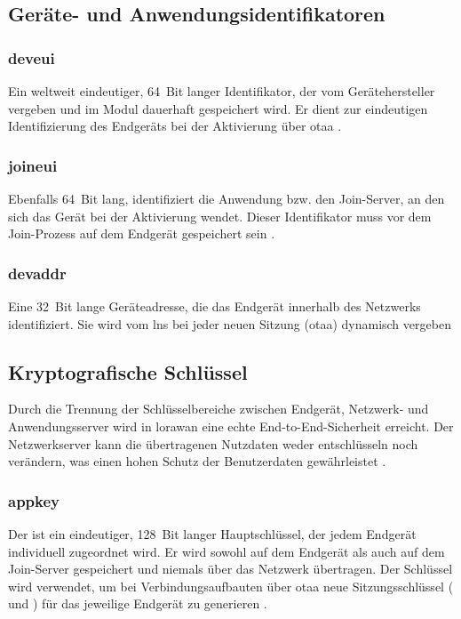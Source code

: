 	\subsection{Geräte- und Anwendungsidentifikatoren}
	
	\subsubsection{\acl{deveui} }
	Ein weltweit eindeutiger, 64~Bit langer Identifikator, der vom Gerätehersteller vergeben und im Modul dauerhaft gespeichert wird. Er dient zur eindeutigen Identifizierung des Endgeräts bei der Aktivierung über \ac{otaa} \cite[44]{LoRaAlliance:2022} \cite{Montagny:2022}.
	
	\subsubsection{\acl{joineui} }
	Ebenfalls 64~Bit lang, identifiziert die Anwendung bzw. den Join-Server, an den sich das Gerät bei der Aktivierung wendet. Dieser Identifikator muss vor dem Join-Prozess auf dem Endgerät gespeichert sein \cite[44]{LoRaAlliance:2022}.
	
	
	\subsubsection{\acl{devaddr}  \label{lorawan:deviceAddr}}
	Eine 32~Bit lange Geräteadresse, die das Endgerät innerhalb des Netzwerks identifiziert. Sie wird vom \ac{lns} bei jeder neuen Sitzung (\ac{otaa}) dynamisch vergeben \cite[42]{LoRaAlliance:2022}
	
	
	\subsection{Kryptografische Schlüssel}
	Durch die Trennung der Schlüsselbereiche zwischen Endgerät, Netzwerk- und Anwendungsserver wird in \ac{lorawan} eine echte End-to-End-Sicherheit erreicht. Der Netzwerkserver kann die übertragenen Nutzdaten weder entschlüsseln noch verändern, was einen hohen Schutz der Benutzerdaten gewährleistet \cite[43]{Montagny:2022}.
	
	\subsubsection{\acl{appkey} }
	Der  ist ein eindeutiger, 128~Bit langer Hauptschlüssel, der jedem Endgerät individuell zugeordnet wird. Er wird sowohl auf dem Endgerät als auch auf dem Join-Server gespeichert und niemals über das Netzwerk übertragen. Der Schlüssel wird verwendet, um bei Verbindungsaufbauten über \ac{otaa} neue Sitzungsschlüssel ( und ) für das jeweilige Endgerät zu generieren \cite[44]{LoRaAlliance:2020b}.
	
